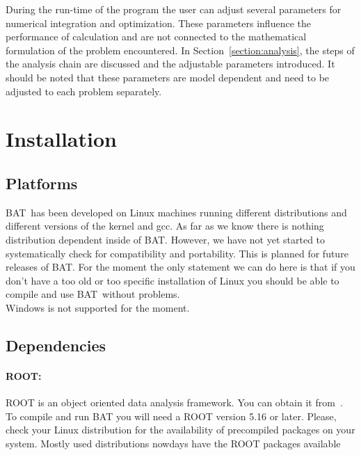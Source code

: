 \documentclass[11pt, a4paper]{article}
\newcommand{\BAT}{{\sc BAT}}
\begin{document}
\noindent 
During the run-time of the program the user can adjust several
parameters for numerical integration and optimization. These
parameters influence the performance of calculation and are not
connected to the mathematical formulation of the problem
encountered. In Section~\ref{section:analysis}, the steps of the
analysis chain are discussed and the adjustable parameters
introduced. It should be noted that these parameters are model
dependent and need to be adjusted to each problem separately. 


\pagebreak 

\section{Installation} 

\subsection{Platforms}

\BAT\ has been developed on Linux machines running different distributions
and different versions of the kernel and gcc. As far as we know there
is nothing distribution dependent inside of \BAT. However, we have not
yet started to systematically check for compatibility and
portability. This is planned for future releases of \BAT. For the
moment the only statement we can do here is that if you don't have a
too old or too specific installation of Linux you should be able to
compile and use \BAT\ without problems. \\ 

Windows is not supported for the moment. \\ 

\subsection{Dependencies}

\paragraph{ROOT:} 
ROOT is an object oriented data analysis framework. You can obtain it
from~\cite{ROOTweb}. To compile and run BAT you
will need a ROOT version 5.16 or later. Please, check your Linux
distribution for the availability of precompiled packages on your
system. Mostly used distributions nowdays have the ROOT packages
available
\end{document}
